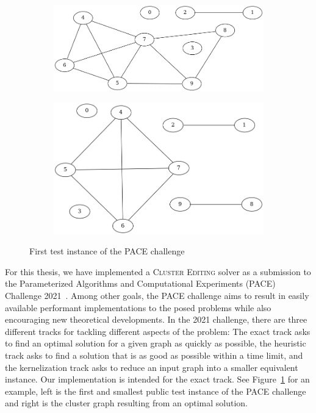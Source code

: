 \documentclass[12pt,oneside,english,parskip=full,headings=small]{scrbook}
\theoremstyle{definition}
\begin{document}
\begin{figure}[h]
	\centering

	\begin{subfigure}{0.49\textwidth}
		\includegraphics[width=1.0\linewidth]{exact001-input}
	\end{subfigure}
	\begin{subfigure}{0.49\textwidth}
		\includegraphics[width=1.0\linewidth]{exact001-output}
	\end{subfigure}

	\caption{First test instance of the PACE challenge}
	\label{fig:exact001}
\end{figure}

For this thesis, we have implemented a \textsc{Cluster Editing} solver as a submission to the
Parameterized Algorithms and Computational Experiments (PACE) Challenge 2021~\cite{Pace}. Among
other goals, the PACE challenge aims to result in easily available performant implementations to the
posed problems while also encouraging new theoretical developments. In the 2021 challenge, there are
three different tracks for tackling different aspects of the problem: The exact track asks to find
an optimal solution for a given graph as quickly as possible, the heuristic track asks to find a
solution that is as good as possible within a time limit, and the kernelization track asks to reduce
an input graph into a smaller equivalent instance. Our implementation is intended for the exact
track. See Figure~\ref{fig:exact001} for an example, left is the first and smallest public test
instance of the PACE challenge and right is the cluster graph resulting from an optimal solution.
\end{document}

